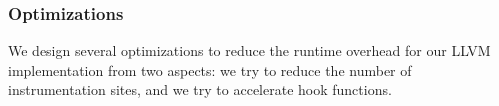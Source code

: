 

\subsubsection{Optimizations}
We design several optimizations to reduce the 
runtime overhead for our LLVM implementation from two aspects:
we try to reduce the number of instrumentation sites, 
and we try to accelerate hook functions. 

